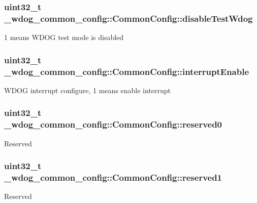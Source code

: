 \subsubsection[{\texorpdfstring{disable\+Test\+Wdog}{disableTestWdog}}]{\setlength{\rightskip}{0pt plus 5cm}uint32\+\_\+t \+\_\+wdog\+\_\+common\+\_\+config\+::\+Common\+Config\+::disable\+Test\+Wdog}\hypertarget{struct__wdog__common__config_1_1CommonConfig_af06845eb5923dc98644c9c6a1a386b24}{}\label{struct__wdog__common__config_1_1CommonConfig_af06845eb5923dc98644c9c6a1a386b24}
1 means W\+D\+OG test mode is disabled 
\subsubsection[{\texorpdfstring{interrupt\+Enable}{interruptEnable}}]{\setlength{\rightskip}{0pt plus 5cm}uint32\+\_\+t \+\_\+wdog\+\_\+common\+\_\+config\+::\+Common\+Config\+::interrupt\+Enable}\hypertarget{struct__wdog__common__config_1_1CommonConfig_a2f30f1af1a7d08a7aa58138416bcff7d}{}\label{struct__wdog__common__config_1_1CommonConfig_a2f30f1af1a7d08a7aa58138416bcff7d}
W\+D\+OG interrupt configure, 1 means enable interrupt 
\subsubsection[{\texorpdfstring{reserved0}{reserved0}}]{\setlength{\rightskip}{0pt plus 5cm}uint32\+\_\+t \+\_\+wdog\+\_\+common\+\_\+config\+::\+Common\+Config\+::reserved0}\hypertarget{struct__wdog__common__config_1_1CommonConfig_a5018e6421a9dd39f740e9579ae4b9777}{}\label{struct__wdog__common__config_1_1CommonConfig_a5018e6421a9dd39f740e9579ae4b9777}
Reserved 
\subsubsection[{\texorpdfstring{reserved1}{reserved1}}]{\setlength{\rightskip}{0pt plus 5cm}uint32\+\_\+t \+\_\+wdog\+\_\+common\+\_\+config\+::\+Common\+Config\+::reserved1}\hypertarget{struct__wdog__common__config_1_1CommonConfig_a8e356a64d1d8b3d23db60cb690ba19a5}{}\label{struct__wdog__common__config_1_1CommonConfig_a8e356a64d1d8b3d23db60cb690ba19a5}
Reserved 

